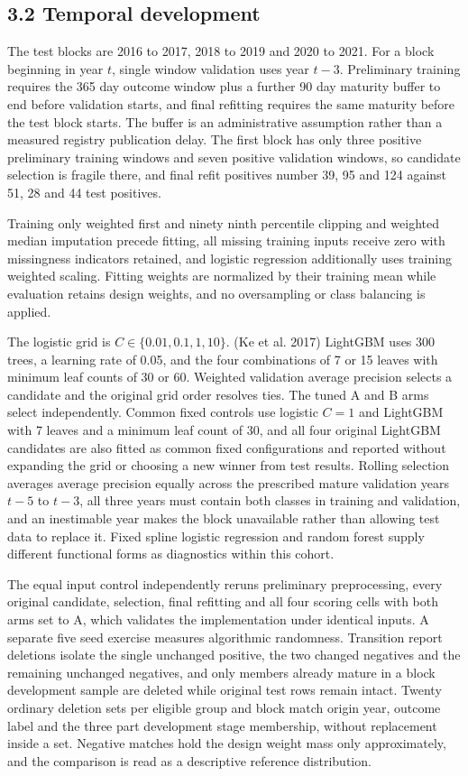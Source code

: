 \documentclass[10pt,a4paper,twocolumn]{article}
\begin{document}
\subsection{3.2 Temporal development}

The test blocks are 2016 to 2017, 2018 to 2019 and 2020 to 2021. For a block beginning in year $t$, single window validation uses year $t-3$. Preliminary training requires the 365 day outcome window plus a further 90 day maturity buffer to end before validation starts, and final refitting requires the same maturity before the test block starts. The buffer is an administrative assumption rather than a measured registry publication delay. The first block has only three positive preliminary training windows and seven positive validation windows, so candidate selection is fragile there, and final refit positives number 39, 95 and 124 against 51, 28 and 44 test positives.

Training only weighted first and ninety ninth percentile clipping and weighted median imputation precede fitting, all missing training inputs receive zero with missingness indicators retained, and logistic regression additionally uses training weighted scaling. Fitting weights are normalized by their training mean while evaluation retains design weights, and no oversampling or class balancing is applied.

The logistic grid is $C\in\{0.01,0.1,1,10\}$. (Ke et al. 2017) LightGBM uses 300 trees, a learning rate of 0.05, and the four combinations of 7 or 15 leaves with minimum leaf counts of 30 or 60. Weighted validation average precision selects a candidate and the original grid order resolves ties. The tuned A and B arms select independently. Common fixed controls use logistic $C=1$ and LightGBM with 7 leaves and a minimum leaf count of 30, and all four original LightGBM candidates are also fitted as common fixed configurations and reported without expanding the grid or choosing a new winner from test results. Rolling selection averages average precision equally across the prescribed mature validation years $t-5$ to $t-3$, all three years must contain both classes in training and validation, and an inestimable year makes the block unavailable rather than allowing test data to replace it. Fixed spline logistic regression and random forest supply different functional forms as diagnostics within this cohort.

The equal input control independently reruns preliminary preprocessing, every original candidate, selection, final refitting and all four scoring cells with both arms set to A, which validates the implementation under identical inputs. A separate five seed exercise measures algorithmic randomness. Transition report deletions isolate the single unchanged positive, the two changed negatives and the remaining unchanged negatives, and only members already mature in a block development sample are deleted while original test rows remain intact. Twenty ordinary deletion sets per eligible group and block match origin year, outcome label and the three part development stage membership, without replacement inside a set. Negative matches hold the design weight mass only approximately, and the comparison is read as a descriptive reference distribution.
\end{document}
